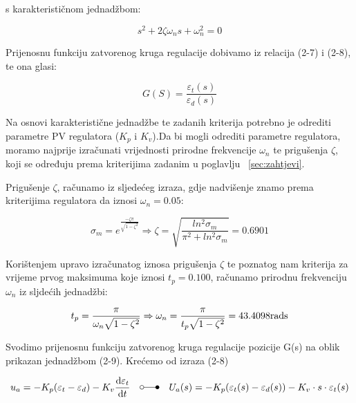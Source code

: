 \documentclass[12pt,a4paper]{article}
\begin{document}
s karakterističnom jednadžbom:

\begin{equation}
s^2+2\zeta\omega_ns+\omega_n^2 = 0
\end{equation}

  

Prijenosnu funkciju zatvorenog kruga regulacije dobivamo iz relacija (2-7) i (2-8), te ona glasi:

\begin{equation}
G(S) = \frac{\varepsilon_t(s)}{\varepsilon_d(s)}
\end{equation}

Na osnovi karakteristične jednadžbe te zadanih kriterija potrebno je odrediti parametre PV regulatora ($K_p$ i $K_v$).Da bi mogli odrediti parametre regulatora, moramo najprije izračunati vrijednosti prirodne frekvencije $\omega_n$ te prigušenja $\zeta$, koji se određuju prema kriterijima zadanim u poglavlju ~\ref{sec:zahtjevi}.

Prigušenje $\zeta$, računamo iz sljedećeg izraza, gdje nadvišenje znamo prema kriterijima regulatora da iznosi $\omega_n = 0.05$:


\begin{equation}
\sigma_m = e^{\frac{-\zeta\pi}{\sqrt{1-\zeta^2}}} \Rightarrow \zeta = \sqrt{\frac{ln^2\sigma_m}{\pi^2 + ln^2\sigma_m}} = 0.6901 
\end{equation}

Korištenjem upravo izračunatog iznosa prigušenja $\zeta$ te poznatog nam kriterija za vrijeme prvog maksimuma koje iznosi $t_p = 0.100$, računamo prirodnu frekvenciju $\omega_n$ iz sljdećih jednadžbi:

\begin{equation}
t_p = \frac{\pi}{\omega_n\sqrt{1-\zeta^2}} \Rightarrow \omega_n = \frac{\pi}{t_p\sqrt{1-\zeta^2}} = 43.4098 \mathrm{rad\\s}
\end{equation}

\newpage

Svodimo prijenosnu funkciju zatvorenog kruga regulacije pozicije G(s) na oblik prikazan jednadžbom (2-9). Krećemo od izraza (2-8)

\begin{equation}
u_a = - K_p(\varepsilon_t - \varepsilon_d) - K_v\frac{\mathrm{d}\varepsilon_t}{\mathrm{d}t} \quad  \laplace \quad U_a(s) = -K_p(\varepsilon_t(s) - \varepsilon_d(s)) - K_v \cdot s \cdot \varepsilon_t(s)
\end{equation}
\end{document}
